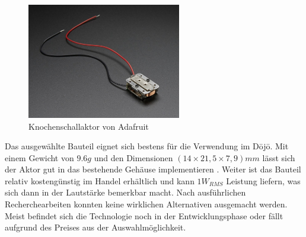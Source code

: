 \begin{figure}[H]
	\begin{center}
		\includegraphics[width=0.6\textwidth]{data/KnochenschallaktorAdafruit1.jpg}
		\caption[Knochenschallaktor \cite{BoneConductorAdafruit}]{Knochenschallaktor von Adafruit} %
		\label{fig:knochenschallAda}
	\end{center}
\end{figure}

Das ausgewählte Bauteil eignet sich bestens für die Verwendung im Dōjō. Mit einem Gewicht von $9.6 g$ und den Dimensionen $(14\times 21,5\times 7,9) mm$ lässt sich der Aktor gut in das bestehende Gehäuse implementieren \cite{BoneConductorAdafruit}. Weiter ist das Bauteil relativ kostengünstig im Handel erhältlich und kann $1W_{RMS}$ Leistung liefern, was sich dann in der Lautstärke bemerkbar macht. Nach ausführlichen Recherchearbeiten konnten keine wirklichen Alternativen ausgemacht werden. Meist befindet sich die Technologie noch in der Entwicklungsphase oder fällt aufgrund des Preises aus der Auswahlmöglichkeit.
